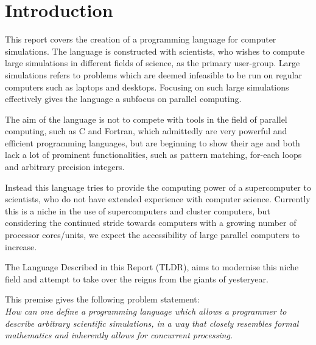 \chapter{Introduction}\label{part:introduction}

This report covers the creation of a programming language for computer simulations. The language is constructed with scientists, who wishes to compute large simulations in different fields of science, as the primary user-group. Large simulations refers to problems which are deemed infeasible to be run on regular computers such as laptops and desktops. Focusing on such large simulations effectively gives the language a subfocus on parallel computing.

The aim of the language is not to compete with tools in the field of parallel computing, such as C and Fortran, which admittedly are very powerful and efficient programming languages, but are beginning to show their age and both lack a lot of prominent functionalities, such as pattern matching, for-each loops and arbitrary precision integers. 

Instead this language tries to provide the computing power of a supercomputer to scientists, who do not have extended experience with computer science. Currently this is a niche in the use of supercomputers and cluster computers, but considering the continued stride towards computers with a growing number of processor cores/units, we expect the accessibility of large parallel computers to increase. 

The Language Described in this Report (TLDR), aims to modernise this niche field and attempt to take over the reigns from the giants of yesteryear.

This premise gives the following problem statement:
\\

\emph{How can one define a programming language which allows a programmer to describe arbitrary scientific simulations, in a way that closely resembles formal mathematics and inherently allows for concurrent processing.}
